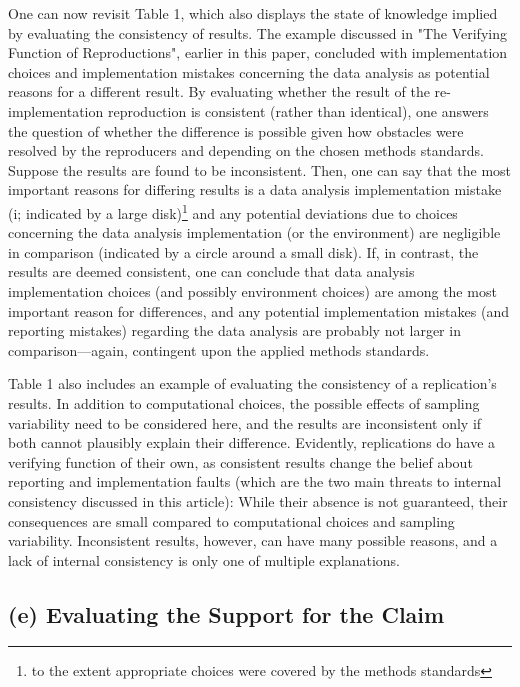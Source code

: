 \documentclass[authordate, meta]{jote-new-article}
\begin{document}
	One can now revisit Table 1, which also displays the state of knowledge implied by evaluating the consistency of results. The example discussed in "The Verifying Function of Reproductions", earlier in this paper, concluded with implementation choices and implementation mistakes concerning the data analysis as potential reasons for a different result. By evaluating whether the result of the re-implementation reproduction is consistent (rather than identical), one answers the question of whether the difference is possible given how obstacles were resolved by the reproducers and depending on the chosen methods standards. Suppose the results are found to be inconsistent. Then, one can say that the most important reasons for differing results is a data analysis implementation mistake (i; indicated by a large disk)\footnote{ to the extent appropriate choices were covered by the methods standards} and any potential deviations due to choices concerning the data analysis implementation (or the environment) are negligible in comparison (indicated by a circle around a small disk). If, in contrast, the results are deemed consistent, one can conclude that data analysis implementation choices (and possibly environment choices) are among the most important reason for differences, and any potential implementation mistakes (and reporting mistakes) regarding the data analysis are probably not larger in comparison—again, contingent upon the applied methods standards.


	Table 1 also includes an example of evaluating the consistency of a replication's results. In addition to computational choices, the possible effects of sampling variability need to be considered here, and the results are inconsistent only if both cannot plausibly explain their difference. Evidently, replications do have a verifying function of their own, as consistent results change the belief about reporting and implementation faults (which are the two main threats to internal consistency discussed in this article): While their absence is not guaranteed, their consequences are small compared to computational choices and sampling variability. Inconsistent results, however, can have many possible reasons, and a lack of internal consistency is only one of multiple explanations.


	\subsection{(e) Evaluating the Support for the Claim}
\end{document}
